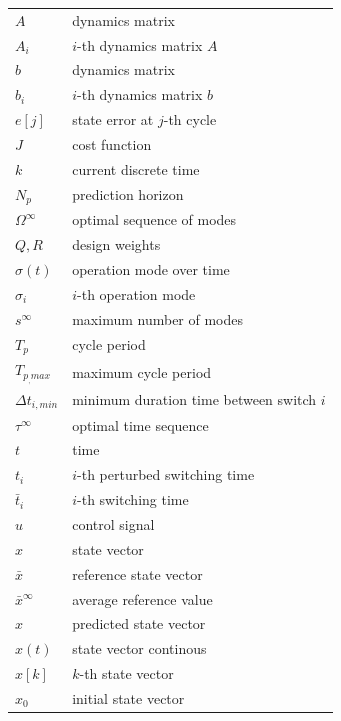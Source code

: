 \begin{longtable}{ll}

$A$ & dynamics matrix\\
$A_i$ & $i$-th dynamics matrix $A$\\
$b$ & dynamics matrix\\
$b_i$ & $i$-th dynamics matrix $b$\\
$e[j]$ & state error at $j$-th cycle\\
$J$ & cost function\\
$k$ & current discrete time\\
$N_p$ & prediction horizon\\
$\Omega^\infty$ & optimal sequence of modes\\
$Q, R$ & design weights\\
$\sigma(t)$ & operation mode over time\\
$\sigma_i$ & $i$-th operation mode\\
$s^\infty$ & maximum number of modes\\
$T_p$ & cycle period\\
$T_{p_,max}$ & maximum cycle period\\
$\Delta t_{i,min}$ & minimum duration time between switch $i$\\
$\tau^\infty$ & optimal time sequence\\
$t$ & time\\
$t_i$ & $i$-th perturbed switching time\\
$\bar{t}_i$ & $i$-th switching time\\
$u$ & control signal\\
$x$ & state vector\\
$\bar{x}$ & reference state vector\\
$\bar{x}^\infty$ & average reference value\\
$\hat{x}$ & predicted state vector\\
$x(t)$ & state vector continous\\
$x[k]$ & $k$-th state vector\\
$x_0$ & initial state vector\\

\end{longtable}

